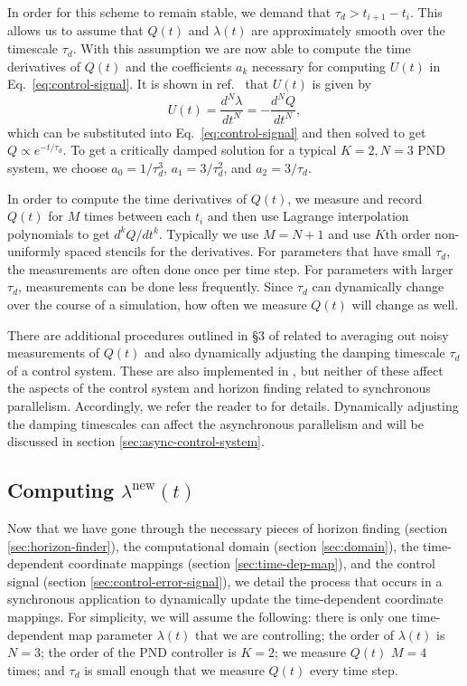 \begin{bibunit}[unsrtnat]
In order for this scheme to remain stable, we
demand that $\tau_{d} > t_{i+1} - t_{i}$. This allows us to assume
that $Q(t)$ and $\lambda(t)$ are approximately
smooth over the timescale $\tau_{d}$.
With this assumption we are now able to compute the time derivatives of $Q(t)$
and the coefficients $a_{k}$ necessary for computing $U(t)$ in
Eq.~\eqref{eq:control-signal}.
It is shown in ref.~\cite{Hemberger:2012jz} that $U(t)$ is given by
\begin{equation}
  \label{eq:UofTdef}
  U(t) = \frac{d^{N}\lambda}{dt^{N}} = -\frac{d^{N}Q}{dt^{N}},
\end{equation}
which can be substituted into Eq.~\eqref{eq:control-signal} and then solved to get
$Q\propto e^{-t/\tau_d}$. To get a critically damped solution for a typical $K
= 2, N = 3$ PND system, we choose $a_{0} = 1/\tau_{d}^{3}$, $a_{1} =
3/\tau_{d}^{2}$, and $a_{2} = 3/\tau_{d}$.

In order to compute the time derivatives of $Q(t)$, we measure and record $Q(t)$
for $M$ times between each $t_i$ and then use Lagrange interpolation polynomials
to get $d^{k}Q/dt^{k}$. Typically we use $M = N + 1$ and use $K\textrm{th}$
order non-uniformly spaced stencils for the derivatives. For parameters that
have small $\tau_d$, the measurements are often done once per time step. For
parameters with larger $\tau_d$, measurements can be done less frequently.
Since $\tau_d$ can dynamically change over the course of a simulation,
how often we measure $Q(t)$ will change as well.

There are additional procedures outlined in \S 3 of \cite{Hemberger:2012jz}
related to averaging out noisy measurements of $Q(t)$ and also dynamically
adjusting the damping timescale $\tau_{d}$ of a control system. These are also
implemented in \spectre, but neither of these affect the aspects of the control
system and horizon finding related to synchronous parallelism. Accordingly, we
refer the reader to \cite{Hemberger:2012jz} for details. Dynamically adjusting
the damping timescales can affect the asynchronous parallelism and will be
discussed in section \ref{sec:async-control-system}.

\subsection{Computing $\lambda^\mathrm{new}(t)$\label{sec:sync-update-lambda}}

Now that we have gone through the necessary pieces of horizon finding (section
\ref{sec:horizon-finder}), the computational domain (section \ref{sec:domain}),
the time-dependent coordinate mappings (section \ref{sec:time-dep-map}), and the
control signal (section \ref{sec:control-error-signal}), we detail the process
that occurs in a synchronous application to dynamically update the
time-dependent coordinate mappings. For simplicity, we will assume the
following: there is only one time-dependent map parameter $\lambda(t)$ that we
are controlling; the order of $\lambda(t)$ is $N = 3$; the order of the PND
controller is $K = 2$; we measure $Q(t)$ $M = 4$ times; and $\tau_d$ is small
enough that we measure $Q(t)$ every time step.


\end{bibunit}
